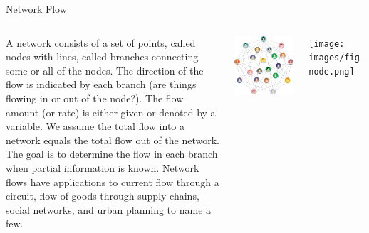\documentclass[xcolor=dvipsnames,aspectratio=169,t]{beamer}
\begin{document}
\begin{frame}{Network Flow}

  \begin{columns}
    \column{0.65\tw}
    {\small
  \bi
  \ii A \alert{network} consists of a set of points, called \alert{nodes} with lines, called \alert{branches} connecting some or all of the nodes.
  \ii The direction of the flow is indicated by each branch (are things flowing in or out of the node?).
  \ii The flow amount (or rate) is either given or denoted by a variable.
  \ii We assume the total flow into a network equals the total flow out of the network.
  \ii The goal is to determine the flow in each branch when partial information is known.
  \ii Network flows have applications to current flow through a circuit, flow of goods through supply chains, social networks, and \alert{urban planning} to name a few.
  \ei
    }
    
  \column{0.35\tw}

  \includegraphics[width=0.95\tw]{images/fig-social-network.png}

  \texttt{[image: images/fig-node.png]}
  
  \end{columns}

  \end{frame}
\end{document}
